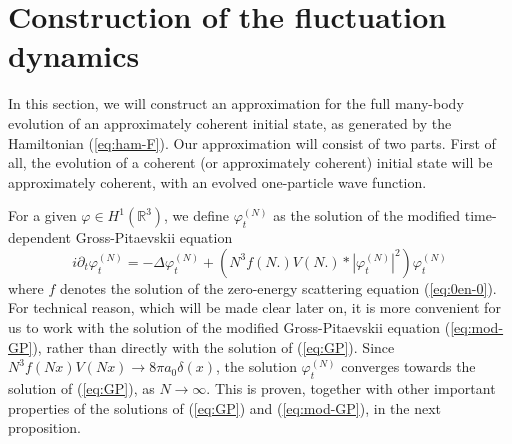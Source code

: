 \documentclass[11pt,a4paper]{article}
\newcommand{\bR}{{\mathbb R}}
\begin{document}
\section{Construction of the fluctuation dynamics}

In this section, we will construct an approximation for the full many-body evolution of an approximately coherent initial state, as generated by the Hamiltonian (\ref{eq:ham-F}). Our approximation will consist 
of two parts. First of all, the evolution of a coherent (or approximately coherent) initial state will be approximately coherent, with an evolved one-particle wave function. 

For a given $\varphi \in H^1 (\bR^3)$, we define $\varphi^{(N)}_t$ as the solution of the modified time-dependent Gross-Pitaevskii equation
\begin{equation}\label{eq:mod-GP} i\partial_t \varphi_t^{(N)} = - \Delta \varphi_t^{(N)} + \left( N^3 f(N.) V(N.) * |\varphi^{(N)}_t|^2 \right) \varphi_t^{(N)} \end{equation}
where $f$ denotes the solution of the zero-energy scattering equation (\ref{eq:0en-0}). 
For technical reason, which will be made clear later on, it is more convenient for us to work with the solution of the modified Gross-Pitaevskii equation (\ref{eq:mod-GP}), rather than directly with the solution of (\ref{eq:GP}). Since $N^3 f(Nx) V(Nx) \to 8 \pi a_0 \delta (x)$, the solution $\varphi_t^{(N)}$ converges towards the solution of (\ref{eq:GP}), as $N \to \infty$. This is proven, together with other important properties of the solutions of (\ref{eq:GP}) and (\ref{eq:mod-GP}), in the next proposition. 
\end{document}
